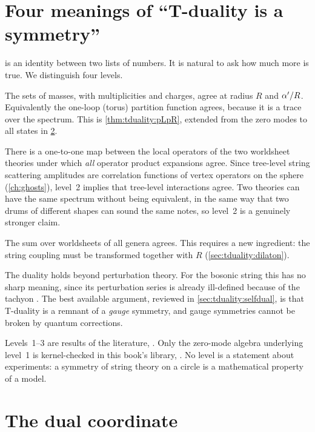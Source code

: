 \section{Four meanings of ``T-duality is a symmetry''}\label{sec:tduality:levels}

 is an identity between two lists of numbers. It is natural to ask how
much more is true. We distinguish four levels.
\begin{description}[leftmargin=1.2em]
\item[Level 1: the free spectrum.] The sets of masses, with multiplicities and charges, agree
 at radius $R$ and $\alpha'/R$. Equivalently the one-loop (torus) partition function agrees, because
 it is a trace over the spectrum. This is \cref{thm:tduality:pLpR}, extended from the zero modes
 to all states in \cref{sec:tduality:Y}.
\item[Level 2: the conformal field theory.] There is a one-to-one map between the local
 operators of the two worldsheet theories under which \emph{all} operator product expansions
 agree. Since tree-level string scattering amplitudes are correlation functions of vertex
 operators on the sphere (\cref{ch:ghosts}), level~2 implies that tree-level interactions
 agree. Two theories can have the same spectrum without being equivalent, in the same way that
 two drums of different shapes can sound the same notes, so level~2 is a genuinely stronger claim.
\item[Level 3: string perturbation theory.] The sum over worldsheets of all genera agrees.
 This requires a new ingredient: the string coupling must be transformed together with $R$
 (\cref{sec:tduality:dilaton}).
\item[Level 4: the exact theory.] The duality holds beyond perturbation theory. For the bosonic
 string this has no sharp meaning, since its perturbation series is already ill-defined because
 of the tachyon . The best available argument, reviewed in
 \cref{sec:tduality:selfdual}, is that T-duality is a remnant of a \emph{gauge} symmetry, and gauge
 symmetries cannot be broken by quantum corrections.
\end{description}
Levels~1--3 are results of the literature, \TL. Only the zero-mode algebra underlying level~1
is kernel-checked in this book's library, \TA. No level is a statement about experiments: a
symmetry of string theory on a circle is a mathematical property of a model.

\section{The dual coordinate}\label{sec:tduality:Y}


